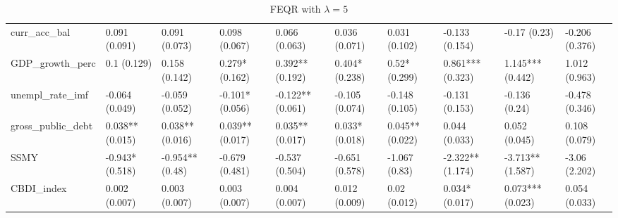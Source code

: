 \begin{table}[H]
\begin{subtable}[c]{\textwidth}
{\begin{tabular}{llllllllll}
  curr\_acc\_bal & 0.091 (0.091) & 0.091 (0.073) & 0.098 (0.067) & 0.066 (0.063) & 0.036 (0.071) & 0.031 (0.102) & -0.133 (0.154) & -0.17 (0.23) & -0.206 (0.376) \\ 
  GDP\_growth\_perc & 0.1 (0.129) & 0.158 (0.142) & 0.279* (0.162) & 0.392** (0.192) & 0.404* (0.238) & 0.52* (0.299) & 0.861*** (0.323) & 1.145*** (0.442) & 1.012 (0.963) \\ 
  unempl\_rate\_imf & -0.064 (0.049) & -0.059 (0.052) & -0.101* (0.056) & -0.122** (0.061) & -0.105 (0.074) & -0.148 (0.105) & -0.131 (0.153) & -0.136 (0.24) & -0.478 (0.346) \\ 
  gross\_public\_debt & 0.038** (0.015) & 0.038** (0.016) & 0.039** (0.017) & 0.035** (0.017) & 0.033* (0.018) & 0.045** (0.022) & 0.044 (0.033) & 0.052 (0.045) & 0.108 (0.079) \\ 
  SSMY & -0.943* (0.518) & -0.954** (0.48) & -0.679 (0.481) & -0.537 (0.504) & -0.651 (0.578) & -1.067 (0.83) & -2.322** (1.174) & -3.713** (1.587) & -3.06 (2.202) \\ 
  CBDI\_index & 0.002 (0.007) & 0.003 (0.007) & 0.003 (0.007) & 0.004 (0.007) & 0.012 (0.009) & 0.02 (0.012) & 0.034* (0.017) & 0.073*** (0.023) & 0.054 (0.033) \\ 
   \bottomrule
\end{tabular}}
\end{subtable}
\\
\begin{subtable}[c]{\textwidth}
\caption{FEQR with $\lambda = 5$}
\centering
{}
\end{subtable}
\end{table}
